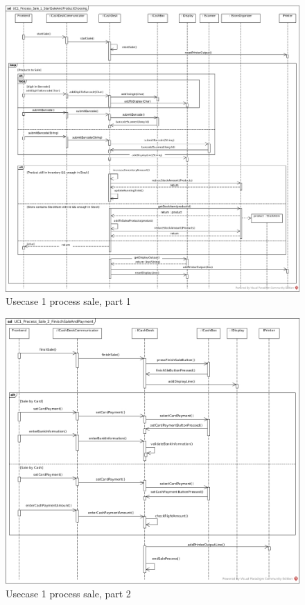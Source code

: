 			\begin{figure}[!h]
				\centering
				\includegraphics[width = 1\textwidth]{img/UC1_Process_Sale_1_StartSaleAndProductChoosing.jpg}
				\caption{Usecase 1 process sale, part 1}
				\label{MS_UC1_1}
			\end{figure}
			
			\begin{figure}[!h]
				\centering
				\includegraphics[width = 1\textwidth]{img/UC1_Process_Sale_2_FinishSaleAndPayment.jpg}
				\caption{Usecase 1 process sale, part 2}
				\label{MS_UC1_2}
			\end{figure}
			
